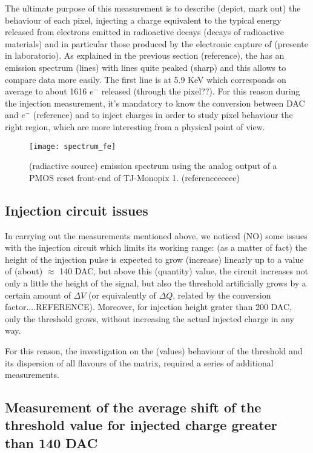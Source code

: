 The ultimate purpose of this measurement is to describe (depict, mark out) the behaviour of each pixel, injecting a charge equivalent to the typical energy released from electrons emitted in radioactive decays (decays of radioactive materials) and in particular those produced by the electronic capture of  (presente in laboratorio). As explained in the previous section (reference), the  has an emission spectrum (lines) with lines quite peaked (sharp) and this allows to compare data more easily. The first line is at 5.9 KeV which corresponds on average to about 1616 $e^{-}$ released (through the pixel??).
For this reason during the injection measurement, it's mandatory to know the conversion between DAC and $e^{-}$ (reference) and to inject charges in order to study pixel behaviour  the right region, which are more interesting from a physical point of view.

\begin{figure}[h!]
\centering
\texttt{[image: spectrum\_fe]}
\caption{ (radiactive source) emission spectrum using the analog output of a PMOS reset front-end of TJ-Monopix 1. (referenceeeeee)}
\label{fig:fespectrum}
\end{figure}

\subsection{Injection circuit issues}

In carrying out the measurements mentioned above, we noticed (NO) some issues with the injection circuit which limits its working range: (as a matter of fact) the height of the injection pulse is expected to grow (increase) linearly up to a value of (about) $\approx$ 140 DAC, but  above this (quantity) value, the circuit increases not only a little the height of the signal, but also the threshold artificially grows by a certain amount of $\Delta V$ (or equivalently of $\Delta Q$, related by the conversion factor....REFERENCE).
Moreover, for injection height grater than 200 DAC, only the threshold grows, without increasing the actual injected charge in any way.

For this reason, the investigation on the (values) behaviour of the threshold and its dispersion of all flavours of the matrix, required a series of additional measurements.

\subsection{Measurement of the average shift of the threshold value for injected charge greater than 140 DAC}

